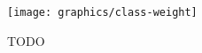 \documentclass{article}
\begin{document}
\begin{figure}[h]
    \caption{TODO}
    \label{class-distribution}
    \centering
    \texttt{[image: graphics/class-weight]}
\end{figure}
\end{document}
